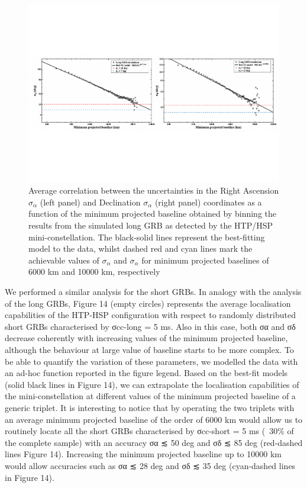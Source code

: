 \documentclass[]{spie}  %
\begin{document}
\begin{figure}[h!]
\centering
\includegraphics[scale=0.45,angle=0]{fig_all_pos_long_reb}
\vspace{-2.5cm}
\caption{Average correlation between the uncertainties in the Right Ascension $\sigma_\alpha$ (left panel) and Declination $\sigma_\alpha$ (right panel) coordinates as a function of the minimum projected baseline obtained by binning the results from the simulated long GRB as detected by the HTP/HSP mini-constellation. The black-solid lines represent the best-fitting model to the data, whilst dashed red and cyan lines mark the achievable values of $\sigma_\alpha$ and $\sigma_\alpha$ for minimum projected baselines of 6000 km and 10000 km, respectively} 
\label{fig:all_pos_long_reb}
\end{figure}

We performed a similar analysis for the short GRBs. In analogy with the analysis of the long GRBs, Figure 14 (empty circles) represents the average localisation capabilities of the HTP-HSP configuration with respect to randomly distributed short GRBs characterised by σcc-long = 5 ms. Also in this case, both σα and σδ decrease coherently with increasing values of the minimum projected baseline, although the behaviour at large value of baseline starts to be more complex. To be able to quantify the variation of these parameters, we modelled the data with an ad-hoc function reported in the figure legend. Based on the best-fit models (solid black lines in Figure 14), we can extrapolate the localisation capabilities of the mini-constellation at different values of the minimum projected baseline of a generic triplet. It is interesting to notice that by operating the two triplets with an average minimum projected baseline of the order of 6000 km would allow us to routinely locate all the short GRBs characterised by σcc-short = 5 ms (~30\% of the complete sample) with an accuracy σα ≲ 50 deg and σδ ≲ 85 deg (red-dashed lines Figure 14). Increasing the minimum projected baseline up to 10000 km would allow accuracies such as σα ≲ 28 deg and σδ ≲ 35 deg (cyan-dashed lines in Figure 14).
\end{document}
